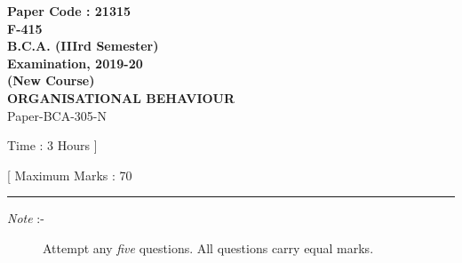 \documentclass[12pt]{article}
\begin{document}
\pagestyle{empty}

\begin{center}

	\textsf{
		\textbf{
			\LARGE Paper Code : 21315\\
			\normalsize F-415\\
			B.C.A. (IIIrd Semester)\\
			Examination, 2019-20\\
			(New Course)\\
			\small{ORGANISATIONAL BEHAVIOUR\\}
		}
		Paper-BCA-305-N
	}

	\begin{minipage}{0.49\linewidth}
		\raggedright\footnotesize Time : 3 Hours ]
	\end{minipage}
	\begin{minipage}{0.49\linewidth}
		\raggedleft\footnotesize [ Maximum Marks : 70
	\end{minipage}

\end{center}

\rule{0.9\linewidth}{0.1mm}

\begin{description}
	\item[\textit{Note }:-] Attempt any \textit{five} questions. All questions carry equal marks.
\end{description}
\end{document}
